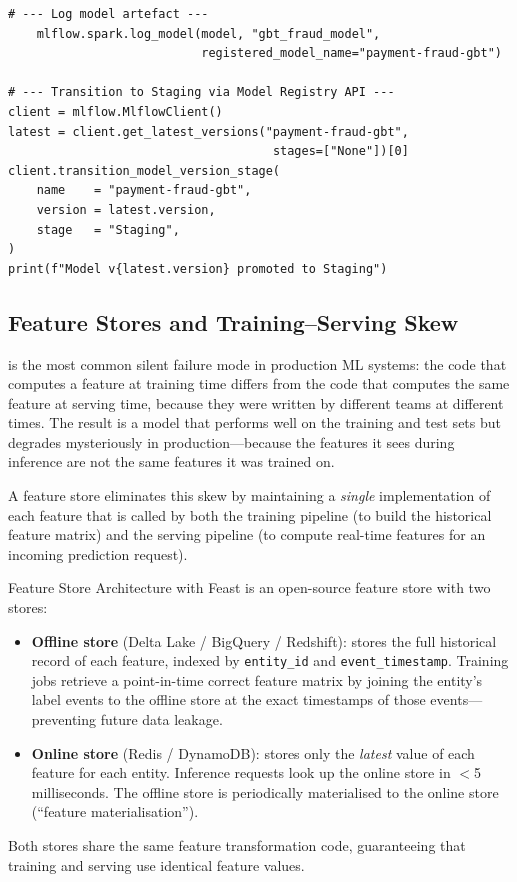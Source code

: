 \begin{lstlisting}[style=pyspark, caption={MLflow experiment tracking and
  model registration in PySpark}]
    # --- Log model artefact ---
    mlflow.spark.log_model(model, "gbt_fraud_model",
                           registered_model_name="payment-fraud-gbt")

# --- Transition to Staging via Model Registry API ---
client = mlflow.MlflowClient()
latest = client.get_latest_versions("payment-fraud-gbt",
                                     stages=["None"])[0]
client.transition_model_version_stage(
    name    = "payment-fraud-gbt",
    version = latest.version,
    stage   = "Staging",
)
print(f"Model v{latest.version} promoted to Staging")
\end{lstlisting}

\subsection{Feature Stores and Training--Serving Skew}
\label{subsec:feature-store}

 is the most common silent failure mode in
production ML systems: the code that computes a feature at training time
differs from the code that computes the same feature at serving time,
because they were written by different teams at different times. The result
is a model that performs well on the training and test sets but degrades
mysteriously in production---because the features it sees during inference
are not the same features it was trained on.

A feature store eliminates this skew by maintaining a \emph{single}
implementation of each feature that is called by both the training pipeline
(to build the historical feature matrix) and the serving pipeline (to
compute real-time features for an incoming prediction request).

\begin{systemdesign}{Feature Store Architecture with Feast}
 is an open-source feature store with two stores:
\begin{itemize}
  \item \textbf{Offline store} (Delta Lake / BigQuery / Redshift):
        stores the full historical record of each feature, indexed by
        \texttt{entity\_id} and \texttt{event\_timestamp}. Training
        jobs retrieve a point-in-time correct feature matrix by joining
        the entity's label events to the offline store at the exact
        timestamps of those events---preventing future data leakage.
  \item \textbf{Online store} (Redis / DynamoDB): stores only the
        \emph{latest} value of each feature for each entity. Inference
        requests look up the online store in $<$5 milliseconds. The
        offline store is periodically materialised to the online store
        (``feature materialisation'').
\end{itemize}
Both stores share the same feature transformation code, guaranteeing
that training and serving use identical feature values.
\end{systemdesign}

